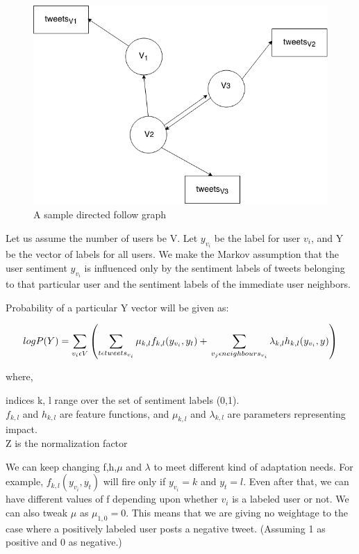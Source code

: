\begin{figure}[t]
\centering
\includegraphics[scale=0.4]{gfx/graph.png}
\caption{A sample directed follow graph}
\end{figure}

Let us assume the number of users be V. Let $y_{v_i}$ be the label for
user $v_i$, and Y be the vector of labels for all users. We make
the Markov assumption that the user sentiment $y_{v_i}$ is influenced only by the sentiment labels of tweets belonging to that particular user and the sentiment labels
of the immediate user neighbors. 
\vspace{8mm}

Probability of a particular Y vector will be given as:


 \begin{equation*}
log P(Y) = \sum_{v_i \epsilon V} \left( \sum_{t \epsilon tweets_{v_i}} \mu_{k,l} f_{k,l} (y_{v_i}, y_t) + \\ \sum_{v_j \epsilon neighbours_{v_i}} \lambda_{k,l} h_{k,l} (y_{v_i}, y_{}) \right)
\end{equation*}

where,

\vspace{8mm}

indices k, l range over the set of sentiment labels (0,1). \\
$f_{k,l}$ and $h_{k,l}$ are feature functions, and $\mu_{k,l}$ and $\lambda_{k,l}$ are parameters representing impact. \\
Z is the normalization factor

\vspace{8mm}

We can keep changing f,h,$\mu$ and $\lambda$ to meet different kind of adaptation needs. For example, $f_{k,l} (y_{v_i}, y_t)$ will fire only if $y_{v_i} = k$ and $y_t = l$.
Even after that, we can have different values of f depending upon whether $v_i$ is a labeled user or not. We can also tweak $\mu$ as $\mu_{1,0}=0$. This means that we are giving 
no weightage to the case where a positively labeled user posts a negative tweet. (Assuming 1 as positive and 0 as negative.)







